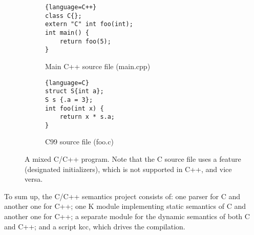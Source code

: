 \documentclass{fithesis3}
\begin{document}
\begin{figure}
\centering
\begin{subfigure}{.5\textwidth}
  \centering

\begin{lstlisting}{language=C++}
class C{};
extern "C" int foo(int);
int main() {
	return foo(5);
}
\end{lstlisting}

  \caption{Main C++ source file (main.cpp)}
\end{subfigure}%
\begin{subfigure}{.5\textwidth}
  \centering
\begin{lstlisting}{language=C}
struct S{int a};
S s {.a = 3};
int foo(int x) {
	return x * s.a;
}
\end{lstlisting}
  \caption{C99 source file (foo.c)}
\end{subfigure}
\caption{A mixed C/C++ program. Note that the C source file uses a feature (designated initializers), which is not supported in C++, and vice versa.}
\label{fig:cpp-program-example}
\end{figure}


To sum up, the C/C++ semantics project consists of: one parser for C and another one for C++; one K module implementing static semantics of C and another one for C++; a separate module for the dynamic semantics of both C and C++; and a script kcc, which drives the compilation.




\end{document}
